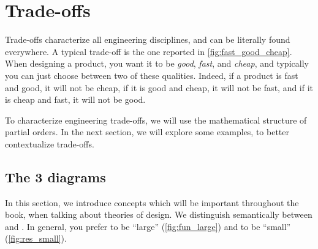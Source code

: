 
\section{Trade-offs}

\begin{marginfigure}
    \centering
    \caption{}
    \label{fig:fast_good_cheap}
\end{marginfigure}

Trade-offs characterize all engineering disciplines, and can be literally found everywhere.
A typical trade-off is the one reported in \cref{fig:fast_good_cheap}.
When designing a product, you want it to be \emph{good}, \emph{fast}, and \emph{cheap}, and typically you can just choose between two of these qualities.
Indeed, if a product is fast and good, it will not be cheap, if it is good and cheap, it will not be fast, and if it is cheap and fast, it will not be good.

To characterize engineering trade-offs, we will use the mathematical structure of partial orders.
In the next section, we will explore some examples, to better contextualize trade-offs.

\subsection{The 3 diagrams}


In this section, we introduce concepts which will be important throughout the book, when talking about theories of design.
We distinguish semantically between  and .
In general, you prefer  to be ``large'' (\cref{fig:fun_large}) and  to be ``small'' (\cref{fig:res_small}).

\begin{figure*}[h]
    \begin{center}
    \end{center}
    \caption{}
\end{figure*}

